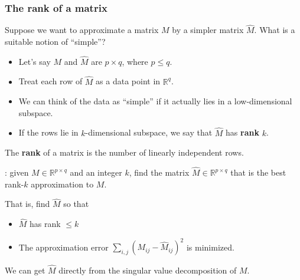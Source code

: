 \documentclass[smaller]{beamer}
\def\R{{\mathbb R}}
\def\darkred{\color{red!70!black}}
\def\vone{{\vskip.1in}}
\def\v2{{\vskip.2in}}
\def\R{{\mathbb R}}
\begin{document}

\begin{frame}
\frametitle{The rank of a matrix}

{\darkred Suppose we want to approximate a matrix $M$ by a simpler matrix $\widehat{M}$. What is a suitable notion of ``simple''?}
\pause
\begin{itemize}
\item Let's say $M$ and $\widehat{M}$ are $p \times q$, where $p \leq q$.
\item Treat each row of $\widehat{M}$ as a data point in $\R^q$.
\item We can think of the data as ``simple'' if it actually lies in a low-dimensional subspace.
\item If the rows lie in $k$-dimensional subspace, we say that $\widehat{M}$ has {\bf rank} $k$.
\end{itemize}
\pause
\alert{The {\bf rank} of a matrix is the number of linearly independent rows.}

\pause\v2
{\darkred {\bf Low-rank approximation}: given $M \in \R^{p \times q}$ and an integer $k$, find the matrix $\widehat{M} \in \R^{p \times q}$ that is the best rank-$k$ approximation to $M$.} 

\pause\vone
That is, find $\widehat{M}$ so that
\begin{itemize}
\item $\widehat{M}$ has rank $\leq k$
\item The approximation error
$ \sum_{i,j} (M_{ij} - \widehat{M}_{ij})^2$
is minimized.
\end{itemize}

\pause
\alert{We can get $\widehat{M}$ directly from the singular value decomposition of $M$.}
\end{frame}
\end{document}
